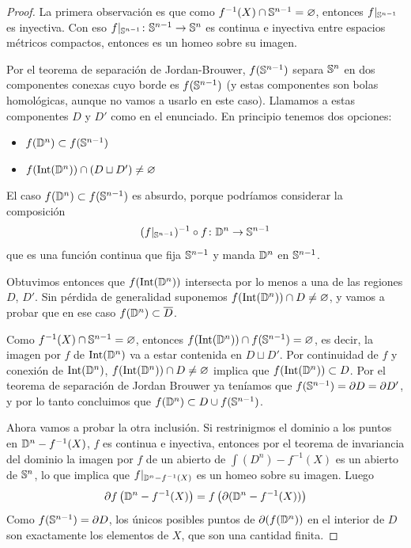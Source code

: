 \begin{proof}

    La primera observación es que como $f^{-1}(X)\cap \mathbb{S}^{n-1}=\varnothing$, entonces $f|_{\mathbb{S}^{n-1}}$ es inyectiva. Con eso $f|_{\mathbb{S}^{n-1}}\colon\mathbb{S}^{n-1}\to\mathbb{S}^n$ es continua e inyectiva entre espacios métricos compactos, entonces es un homeo sobre su imagen. 
    
    Por el teorema de separación de Jordan-Brouwer, $f(\mathbb{S}^{n-1})$ separa $\mathbb{S}^n$ en dos componentes conexas cuyo borde es $f(\mathbb{S}^{n-1})$ (y estas componentes son bolas homológicas, aunque no vamos a usarlo en este caso). Llamamos a estas componentes $D$ y $D'$ como en el enunciado. En principio tenemos dos opciones:

    \begin{itemize}
        \item $f(\mathbb{D}^n)\subset f(\mathbb{S}^{n-1})$
        \item $f(\text{Int}(\mathbb{D}^n))\cap (D\sqcup D')\neq\varnothing$
    \end{itemize}
    
    El caso $f(\mathbb{D}^n)\subset f(\mathbb{S}^{n-1})$ es absurdo, porque podríamos considerar la composición $$(f|_{\mathbb{S}^{n-1}})^{-1}\circ f\colon \mathbb{D}^n\to\mathbb{S}^{n-1}$$ que es una función continua que fija $\mathbb{S}^{n-1}$ y manda $\mathbb{D}^n$ en $\mathbb{S}^{n-1}$. 
    
    Obtuvimos entonces que $f(\text{Int}(\mathbb{D}^n))$ intersecta por lo menos a una de las regiones $D$, $D'$. Sin pérdida de generalidad suponemos $f(\text{Int}(\mathbb{D}^n))\cap D\neq\varnothing$, y vamos a probar que en ese caso $f(\mathbb{D}^n)\subset\overline{D}$.
    
    Como $f^{-1}(X)\cap \mathbb{S}^{n-1} =\varnothing$, entonces $f(\text{Int}(\mathbb{D}^n))\cap f(\mathbb{S}^{n-1})=\varnothing$, es decir, la imagen por $f$ de $\text{Int}(\mathbb{D}^n)$ va a estar contenida en $D\sqcup D'$. Por continuidad de $f$ y conexión de $\text{Int}(\mathbb{D}^n)$, $f(\text{Int}(\mathbb{D}^n))\cap D\neq\varnothing$ implica que $f(\text{Int}(\mathbb{D}^n))\subset D$. Por el teorema de separación de Jordan Brouwer ya teníamos que $f(\mathbb{S}^{n-1})=\partial D=\partial D'$, y por lo tanto concluimos que $f(\mathbb{D}^n)\subset D\cup f(\mathbb{S}^{n-1})$.

    Ahora vamos a probar la otra inclusión. Si restrinigmos el dominio a los puntos en $\mathbb{D}^n-f^{-1}(X)$, $f$ es continua e inyectiva, entonces por el teorema de invariancia del dominio la imagen por $f$ de un abierto de $\int(D^n) - f^{-1}(X)$ es un abierto de $\mathbb{S}^n$, lo que implica que $f|_{\mathbb{D}^n-f^{-1}(X)}$ es un homeo sobre su imagen. Luego $$\partial f\left(\mathbb{D}^n-f^{-1}(X)\right) = f\left(\partial(\mathbb{D}^n-f^{-1}(X))\right)$$ Como $f(\mathbb{S}^{n-1})=\partial D$, los únicos posibles puntos de $\partial(f(\mathbb{D}^n))$ en el interior de $D$ son exactamente los elementos de $X$, que son una cantidad finita.


\end{proof}

